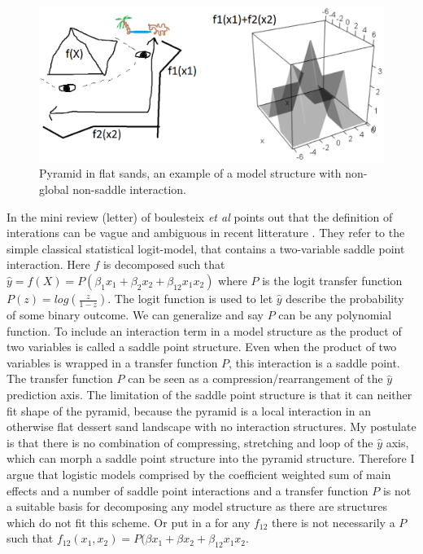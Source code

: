 \begin{figure}
\includegraphics[width=\textwidth,height=\textheight,keepaspectratio]{graphics/sketch_pyramid_interaction.png}
\caption{Pyramid in flat sands, an example of a model structure with non-global non-saddle interaction.}
\label{pyramid}
\end{figure}

In the mini review (letter) of boulesteix \textit{et al} points out that the definition of interations can be vague and ambiguous in recent litterature \cite{boulesteix2014letter}. They refer to the simple classical statistical logit-model, that contains a two-variable saddle point interaction. Here $f$ is decomposed such that $\hat{y} = f(X) = P(\beta_1 x_1 + \beta_2 x_2 + \beta_{12} x_1 x_2)$ where $P$ is the logit transfer function $P(z) = log(\frac{z}{1-z})$. The logit function is used to let $\hat{y}$ describe the probability of some binary outcome. We can generalize and say $P$ can be any polynomial function. To include an interaction term in a model structure as the product of two variables is called a saddle point structure. Even when the product of two variables is wrapped in a transfer function $P$, this interaction is a saddle point. The transfer function $P$ can be seen as a compression/rearrangement of the $\hat{y}$ prediction axis. The limitation of the saddle point structure is that it can neither fit shape of the pyramid, because the pyramid is a local interaction in an otherwise flat dessert sand landscape with no interaction structures. My postulate is that there is no combination of compressing, stretching and loop of the $\hat{y}$ axis, which can morph a saddle point structure into the pyramid structure. Therefore I argue that logistic models comprised by the coefficient weighted sum of main effects and a number of saddle point interactions and a transfer function $P$ is not a suitable basis for decomposing any model structure as there are structures which do not fit this scheme. Or put in a for any $f_12$ there is not necessarily a $P$ such that $f_{12}(x_1,x_2) = P(\beta x_1+ \beta x_2 + \beta_{12} x_1 x_2$. 

